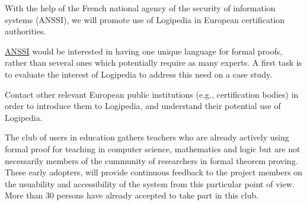 \begin{workpackage}[id=dissemination,type=MGT,
  short={Dissemination},
  title={Dissemination, communication and exploitation},
  lead=Inr,InrRM=12,BirRM=4,IrtRM=4,ImtRM=2,StrRM=2,ZibRM=14,EduRM=12]
\begin{tasklist}
  \begin{task}[id=certifiers-club,
      title=Promoting the use of Logipedia by certification
      authorities, lead=Imt,ImtRM=2,wphases=1-48!.05]
    With the help of the French national agency of the security of
    information systems (ANSSI), we will promote use of Logipedia in
    European certification authorities.
    \begin{compactitem}
    \item \href{https://www.ssi.gouv.fr/}{ANSSI} would be interested in having one unique language for formal
proofs, rather than several ones which potentially require as many
experts. A first task is to evaluate the interest of Logipedia to address
this need on a case study.
\item Contact other relevant European public institutions
(e.g., certification bodies) in order to introduce them to Logipedia,
and understand their potential use of Logipedia.
    \end{compactitem}
  \end{task}

  \begin{task}[id=teachers-club,
      title=Expanding the use of Logipedia in education,
      lead=Str,StrRM=2,wphases=1-48!.05]
    The club of users in education gathers
    teachers who are already actively using formal proof for teaching
    in computer science, mathematics and logic but are not necessarily
    members of the cummunity of researchers in formal theorem
    proving. These early adopters, will provide continuous feedback to
    the project members on the usuability and accessibility of the
    system from this particular point of view.  More than 30 persons
    have already accepted to take part in this club.




\end{task}
\end{tasklist}
\end{workpackage}
